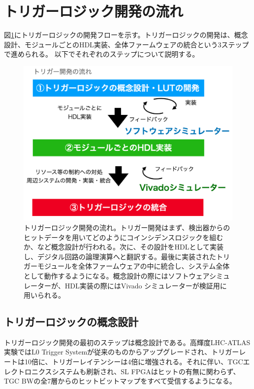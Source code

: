 \section{トリガーロジック開発の流れ}
\label{sec_TriggerTestSystem}
図\ref{Trigger_flow}にトリガーロジックの開発フローを示す。トリガーロジックの開発は、概念設計、モジュールごとのHDL実装、全体ファームウェアの統合という3ステップで進められる。
以下でそれぞれのステップについて説明する。

\begin{figure} 
\centering
\includegraphics[width=16cm]{fig/SL/Trigger_flow.png}
\caption[TGCトリガー開発の流れ]{トリガーロジック開発の流れ。トリガー開発はまず、検出器からのヒットデータを用いてどのようにコインシデンスロジックを組むか、など概念設計が行われる。次に、その設計をHDLとして実装し、デジタル回路の論理演算へと翻訳する。最後に実装されたトリガーモジュールを全体ファームウェアの中に統合し、システム全体として動作するようになる。概念設計の際にはソフトウェアシミュレーターが、HDL実装の際にはVivado シミュレーターが検証用に用いられる。}
\label{Trigger_flow}
\end{figure}

\subsection*{トリガーロジックの概念設計}
トリガーロジック開発の最初のステップは概念設計である。高輝度LHC-ATLAS実験ではL0 Trigger Systemが従来のものからアップグレードされ、トリガーレートは10倍に、トリガーレイテンシーは4倍に増強される。それに伴い、TGCエレクトロニクスシステムも刷新され、SL FPGAはヒットの有無に関わらず、TGC BWの全7層からのヒットビットマップをすべて受信するようになる。

